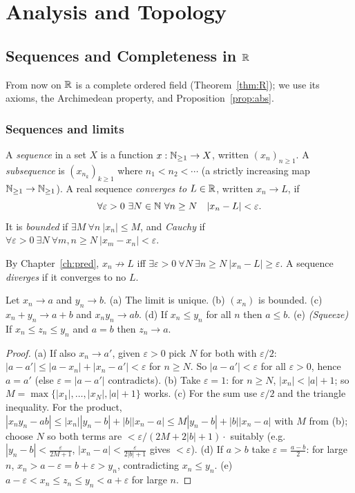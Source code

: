 \part{Analysis and Topology}

\chapter{Sequences and Completeness in $\mathbb{R}$}\label{ch:seq}

From now on $\mathbb{R}$ is a complete ordered field (Theorem~\ref{thm:R}); we use its axioms, the Archimedean property, and Proposition~\ref{prop:abs}.

\section{Sequences and limits}

\begin{definition}
	A \emph{sequence} in a set $X$ is a function $x:\mathbb{N}_{\ge1}\to X$, written $(x_n)_{n\ge1}$. A \emph{subsequence} is $(x_{n_k})_{k\ge1}$ where $n_1<n_2<\cdots$ (a strictly increasing map $\mathbb{N}_{\ge1}\to\mathbb{N}_{\ge1}$). A real sequence \emph{converges to $L\in\mathbb{R}$}, written $x_n\to L$, if
	\[
	\forall\varepsilon>0\ \exists N\in\N\ \forall n\ge N\quad|x_n-L|<\varepsilon.
	\]
	It is \emph{bounded} if $\exists M\ \forall n\ |x_n|\le M$, and \emph{Cauchy} if $\forall\varepsilon>0\ \exists N\ \forall m,n\ge N\ |x_m-x_n|<\varepsilon$.
\end{definition}

By Chapter~\ref{ch:pred}, $x_n\not\to L$ iff $\exists\varepsilon>0\ \forall N\ \exists n\ge N\ |x_n-L|\ge\varepsilon$. A sequence \emph{diverges} if it converges to no $L$.

\begin{theorem}\label{thm:limitlaws}
	Let $x_n\to a$ and $y_n\to b$. (a) The limit is unique. (b) $(x_n)$ is bounded. (c) $x_n+y_n\to a+b$ and $x_ny_n\to ab$. (d) If $x_n\le y_n$ for all $n$ then $a\le b$. (e) \emph{(Squeeze)} If $x_n\le z_n\le y_n$ and $a=b$ then $z_n\to a$.
\end{theorem}
\begin{proof}
	(a) If also $x_n\to a'$, given $\varepsilon>0$ pick $N$ for both with $\varepsilon/2$: $|a-a'|\le|a-x_n|+|x_n-a'|<\varepsilon$ for $n\ge N$. So $|a-a'|<\varepsilon$ for all $\varepsilon>0$, hence $a=a'$ (else $\varepsilon=|a-a'|$ contradicts). (b) Take $\varepsilon=1$: for $n\ge N$, $|x_n|<|a|+1$; so $M=\max\{|x_1|,\dots,|x_{N}|,|a|+1\}$ works. (c) For the sum use $\varepsilon/2$ and the triangle inequality. For the product, $|x_ny_n-ab|\le|x_n||y_n-b|+|b||x_n-a|\le M|y_n-b|+|b||x_n-a|$ with $M$ from (b); choose $N$ so both terms are $<\varepsilon/(2M+2|b|+1)\cdot$ suitably (e.g.\ $|y_n-b|<\frac\varepsilon{2M+1}$, $|x_n-a|<\frac\varepsilon{2|b|+1}$ gives $<\varepsilon$). (d) If $a>b$ take $\varepsilon=\frac{a-b}2$: for large $n$, $x_n>a-\varepsilon=b+\varepsilon>y_n$, contradicting $x_n\le y_n$. (e) $a-\varepsilon<x_n\le z_n\le y_n<a+\varepsilon$ for large $n$.
\end{proof}

